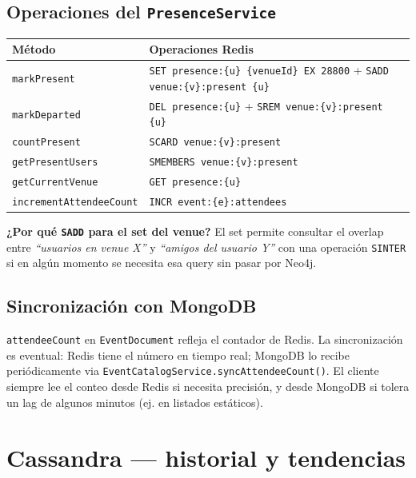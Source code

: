 \documentclass[12pt, a4paper]{article}
\newcommand{\code}[1]{\texttt{#1}}
\begin{document}
\subsection{Operaciones del \code{PresenceService}}

\begin{tabularx}{\textwidth}{@{}lX@{}}
  \toprule
  \textbf{Método}             & \textbf{Operaciones Redis} \\
  \midrule
  \code{markPresent}          & \code{SET presence:\{u\} \{venueId\} EX 28800} + \code{SADD venue:\{v\}:present \{u\}} \\
  \code{markDeparted}         & \code{DEL presence:\{u\}} + \code{SREM venue:\{v\}:present \{u\}} \\
  \code{countPresent}         & \code{SCARD venue:\{v\}:present} \\
  \code{getPresentUsers}      & \code{SMEMBERS venue:\{v\}:present} \\
  \code{getCurrentVenue}      & \code{GET presence:\{u\}} \\
  \code{incrementAttendeeCount} & \code{INCR event:\{e\}:attendees} \\
  \bottomrule
\end{tabularx}

\vspace{0.5em}
\textbf{¿Por qué \code{SADD} para el set del venue?}
El set permite consultar el overlap entre \emph{``usuarios en venue X''} y
\emph{``amigos del usuario Y''} con una operación \code{SINTER} si en algún
momento se necesita esa query sin pasar por Neo4j.

\subsection{Sincronización con MongoDB}

\code{attendeeCount} en \code{EventDocument} refleja el contador de Redis.
La sincronización es eventual: Redis tiene el número en tiempo real; MongoDB
lo recibe periódicamente via \code{EventCatalogService.syncAttendeeCount()}.
El cliente siempre lee el conteo desde Redis si necesita precisión, y desde
MongoDB si tolera un lag de algunos minutos (ej. en listados estáticos).

\section{Cassandra — historial y tendencias}
\label{sec:cassandra}
\end{document}

